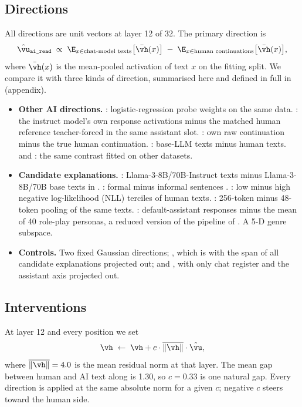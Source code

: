 \subsection{Directions}

All directions are unit vectors at layer 12 of 32.
The primary direction is
\begin{equation}
\hat{\vu}_{\text{\airead}} \;\propto\; \E_{x \in \text{chat-model texts}}\big[\bar{\vh}(x)\big] \;-\; \E_{x \in \text{human continuations}}\big[\bar{\vh}(x)\big],
\end{equation}
where $\bar{\vh}(x)$ is the mean-pooled activation of text $x$ on the \hape fitting split.
We compare it with three kinds of direction, summarised here and defined in full in  (appendix).

\begin{itemize}[leftmargin=*,itemsep=0pt,topsep=0pt]
    \item {\bf Other AI directions.} \ailr: logistic-regression probe weights on the same data. \writechat: the instruct model's own response activations minus the matched human reference teacher-forced in the same assistant slot. \writeraw: own raw continuation minus the true human continuation. \aibase: base-LLM texts minus human texts. \aihc and : the same contrast fitted on other datasets.
    \item {\bf Candidate explanations.} \chatreg: Llama-3-8B/70B-Instruct texts minus Llama-3-8B/70B base texts in \hape. \formality: formal minus informal sentences \citep{pavlick2016formality}. \fluency: low minus high negative log-likelihood (NLL) terciles of human texts. \lengthdir: 256-token minus 48-token pooling of the same texts. \asstaxis: default-assistant responses minus the mean of 40 role-play personas, a reduced version of the pipeline of \citet{lu2026assistant}. A 5-D genre subspace.
    \item {\bf Controls.} Two fixed Gaussian \randdir directions; \perpall, which is \airead with the span of all candidate explanations projected out; and \perppersona, with only chat register and the assistant axis projected out.
\end{itemize}

\subsection{Interventions}

 At layer 12 and every position we set
\begin{equation}
\vh \;\leftarrow\; \vh + c \cdot \overline{\|\vh\|} \cdot \hat{\vu},
\end{equation}
where $\overline{\|\vh\|} = 4.0$ is the mean residual norm at that layer.
The mean gap between human and AI text along \airead is 1.30, so $c = 0.33$ is one natural gap.
Every direction is applied at the same absolute norm for a given $c$; negative $c$ steers toward the human side.

